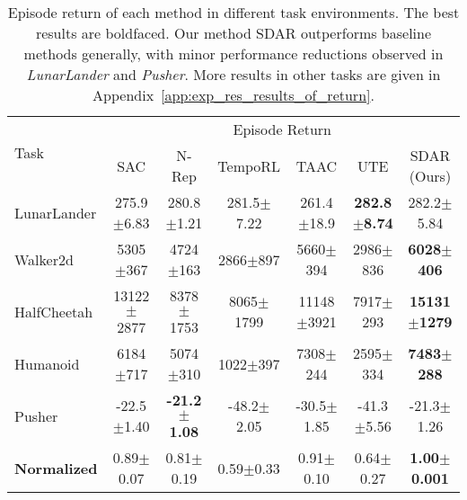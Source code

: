 \begin{table}[t]
\caption{
Episode return of each method in different task environments.
The best results are boldfaced.
Our method SDAR outperforms baseline methods generally, with minor performance reductions observed in \emph{LunarLander} and \emph{Pusher}.
More results in other tasks are given in Appendix~\ref{app:exp_res_results_of_return}.
}
\begin{center}
\begin{small}
\begin{tabular}{lcccccc}
\toprule
\multirow{2}{*}{Task} & \multicolumn{6}{c}{Episode Return}  \\
\cmidrule{2-7}
& SAC & N-Rep & TempoRL & TAAC & UTE & SDAR (Ours) \\ 
\midrule
LunarLander & 275.9$\pm$6.83 & 280.8$\pm$1.21 & 281.5$\pm$7.22 & 261.4$\pm$18.9 & \textbf{282.8$\pm$8.74} & 282.2$\pm$5.84 \\ 
Walker2d & 5305$\pm$367 & 4724$\pm$163 & 2866$\pm$897 & 5660$\pm$394 & 2986$\pm$836 & \textbf{6028$\pm$406} \\ 
HalfCheetah & 13122$\pm$2877 & 8378$\pm$1753 & 8065$\pm$1799 & 11148$\pm$3921 & 7917$\pm$293 & \textbf{15131$\pm$1279} \\ 
Humanoid & 6184$\pm$717 & 5074$\pm$310 & 1022$\pm$397 & 7308$\pm$244 & 2595$\pm$334 & \textbf{7483$\pm$288} \\ 
Pusher & -22.5$\pm$1.40 & \textbf{-21.2$\pm$1.08} & -48.2$\pm$2.05 & -30.5$\pm$1.85 & -41.3$\pm$5.56 & -21.3$\pm$1.26 \\ 
\midrule
\textbf{Normalized} & 0.89$\pm$0.07 & 0.81$\pm$0.19 & 0.59$\pm$0.33 & 0.91$\pm$0.10 & 0.64$\pm$0.27 & \textbf{1.00$\pm$0.001} \\ 
\bottomrule
\end{tabular}
\end{small}
\end{center}
\label{tab:exp_results_return}
\end{table}

